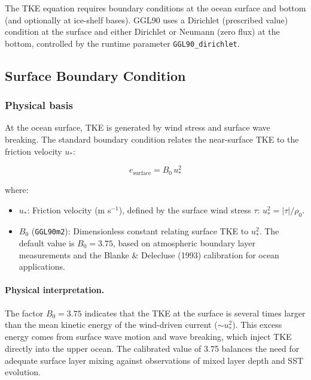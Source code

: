 \documentclass[12pt,letterpaper]{article}
\begin{document}
The TKE equation requires boundary conditions at the ocean surface and bottom (and optionally at ice-shelf bases). GGL90 uses a Dirichlet (prescribed value) condition at the surface and either Dirichlet or Neumann (zero flux) at the bottom, controlled by the runtime parameter \verb|GGL90_dirichlet|.

\subsection{Surface Boundary Condition}
\label{sec:bc_surface}

\subsubsection{Physical basis}

At the ocean surface, TKE is generated by wind stress and surface wave breaking. The standard boundary condition relates the near-surface TKE to the friction velocity $u_*$:

\begin{equation}
e_{\text{surface}} = B_0 \, u_*^2
\label{eq:surface_bc}
\end{equation}

where:
\begin{itemize}
\item $u_*$: Friction velocity (m s$^{-1}$), defined by the surface wind stress $\tau$: $u_*^2 = |\tau| / \rho_0$.
\item $B_0$ (\verb|GGL90m2|): Dimensionless constant relating surface TKE to $u_*^2$. The default value is $B_0 = 3.75$, based on atmospheric boundary layer measurements and the Blanke \& Delecluse (1993) calibration for ocean applications.
\end{itemize}

\paragraph{Physical interpretation.} The factor $B_0 = 3.75$ indicates that the TKE at the surface is several times larger than the mean kinetic energy of the wind-driven current ($\sim u_*^2$). This excess energy comes from surface wave motion and wave breaking, which inject TKE directly into the upper ocean. The calibrated value of 3.75 balances the need for adequate surface layer mixing against observations of mixed layer depth and SST evolution.
\end{document}
